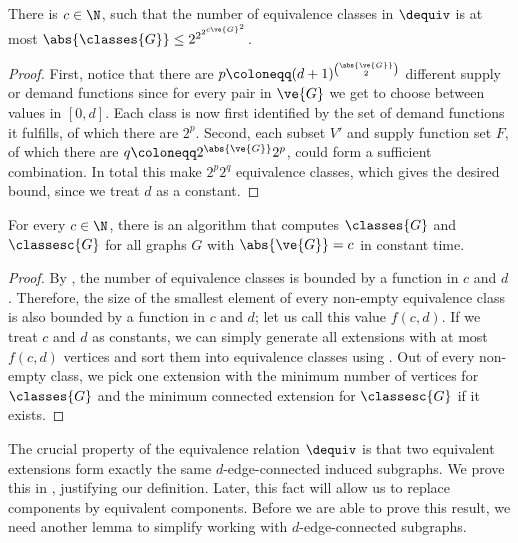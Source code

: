 \begin{lemma}
\iflong
\begin{lemma}
\else
\begin{lemma}[$\star$]
\fi
\label{lem:number_equiv}
  There is $c \in \N$, such that the number of equivalence classes in $\dequiv$ is at most $\abs{\classes{G}} \le 2^{2^{2^{c\ve{G}^2}}}$. 
\end{lemma}
\iflong
\begin{proof}
  First, notice that there are $p \coloneqq (d+1)^{\binom{\abs{\ve{G}}}{2}}$ different supply or demand functions since for every pair in $\ve{G}$ we get to choose between values in $[0, d]$.
  Each class is now first identified by the set of demand functions it fulfills, of which there are $2^p$. Second, each subset $V'$ and supply function set $F$, of which there are $q \coloneqq 2^{\abs{\ve{G}}}2^p$, could form a sufficient combination. In total this make $2^p2^q$ equivalence classes, which gives the desired bound, since we treat $d$ as a constant.
\end{proof}
\fi

\iflong
\begin{lemma}
\else
\begin{lemma}[$\star$]
\fi
\label{lem:compute_classes}
  For every $c \in \N$, there is an algorithm that computes $\classes{G}$ and $\classesc{G}$ for all graphs $G$ with $\abs{\ve{G}} = c$ in constant time.
\end{lemma}
\iflong
\begin{proof}
  By , the number of equivalence classes is bounded by a function in $c$ and $d$. Therefore, the size of the smallest element of every non-empty equivalence class is also bounded by a function in $c$ and $d$; let us call this value $f(c,d)$. If we treat $c$ and $d$ as constants, we can simply generate all extensions with at most $f(c,d)$ vertices and sort them into equivalence classes using . Out of every non-empty class, we pick one extension with the minimum number of vertices for $\classes{G}$ and the minimum connected extension for $\classesc{G}$ if it exists.
\end{proof}
\fi

The crucial property of the equivalence relation $\dequiv$ is that two equivalent extensions form exactly the same $d$-edge-connected induced subgraphs. We prove this in , justifying our definition. Later, this fact will allow us to replace components by equivalent components. Before we are able to prove this result, we need another lemma to simplify working with $d$-edge-connected subgraphs.


\end{lemma}
\end{lemma}
\end{lemma}
